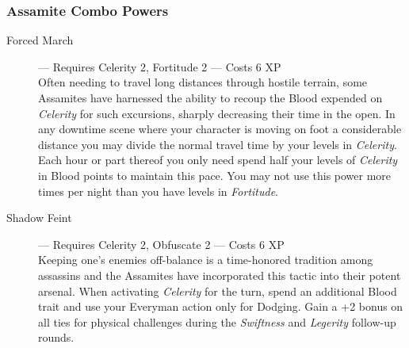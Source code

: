 \subsubsection{Assamite Combo Powers}
\begin{description}
	\item[Forced March]--- Requires Celerity 2, Fortitude 2 --- Costs 6 XP \\
	Often needing to travel long distances through hostile terrain, some Assamites have harnessed the 
	ability to recoup the Blood expended on \emph{Celerity} for such excursions, sharply decreasing 
	their time in the open.  In any downtime scene where your character is moving on foot a 
	considerable distance you may divide the normal travel time by your levels in \emph{Celerity}.  
	Each hour or part thereof you only need spend half your levels of \emph{Celerity} in Blood points 
	to maintain this pace.  You may not use this power more times per night than you have levels in 
	\emph{Fortitude}.
	\item[Shadow Feint]--- Requires Celerity 2, Obfuscate 2 --- Costs 6 XP \\
	Keeping one's enemies off-balance is a time-honored tradition among assassins and the Assamites 
	have incorporated this tactic into their potent arsenal.  When activating \emph{Celerity} for the 
	turn, spend an additional Blood trait and use your Everyman action only for Dodging.  Gain a +2 
	bonus on all ties for physical challenges during the \emph{Swiftness} and \emph{Legerity} follow-up 
	rounds.
\end{description}

